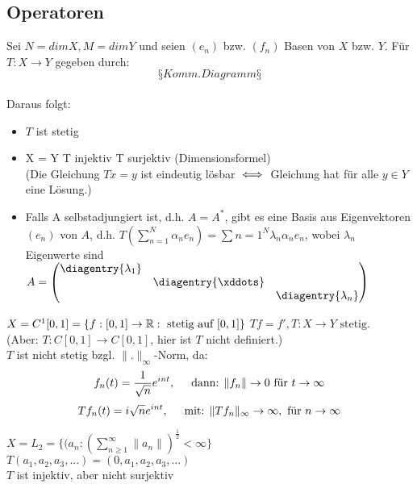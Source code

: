 \subsection{Operatoren}

Sei $N = dim X, M = dim Y$ und seien $(e_n)$ bzw. $(f_n)$ Basen von $X$ bzw. $Y$.
Für $T : X \rightarrow Y$ gegeben durch: \\
\[ §Komm. Diagramm§ \] \\
Daraus folgt:
\begin{itemize}
	\item $T$ ist stetig
	\item X = Y \gdw T injektiv \gdw T surjektiv (Dimensionsformel) \\
	(Die Gleichung $Tx = y$ ist eindeutig lösbar $\iff$ Gleichung hat für alle $y \in Y$ eine Lösung.)
	\item Falls A selbstadjungiert ist, d.h. $A = A^{*}$, gibt es eine Basis aus Eigenvektoren $(e_{n})$ von $A$, d.h. $ T( \sum_{n=1}^{N} \alpha_{n} e_{n} ) = \sum{n=1}^{N} \lambda_{n} \alpha_{n} e_{n}$, wobei $\lambda_{n}$ Eigenwerte sind $A =
			\begin{pmatrix}
				\diagentry{\lambda_{1}}\\
				&\diagentry{\xddots}\\
				&&\diagentry{\lambda_{n}}\\
			\end{pmatrix} $ %
\end{itemize}

\begin{beispiel}[1]
$X = C^{1}[0, 1] = \{ f : [0, 1] \rightarrow \mathbb{R}: \text{ stetig auf } [0, 1] \}$ 
$T f = f', T : X \rightarrow Y \text{ stetig.} $ \\
(Aber: $T: C[0, 1] \rightarrow C[0, 1]$, hier ist $T$ nicht definiert.) \\
$T$ ist nicht stetig bzgl. $\|.\|_{\infty}$-Norm, da:
\[ f_{n}(t) = \frac{1}{\sqrt{n}}e^{int}, \hspace{0.5cm}  \text{dann: } \|f_{n}\| \rightarrow 0 \text{ für } t \rightarrow \infty \]	
\[ T f_{n}(t) = i \sqrt{n} e^{int}, \hspace{0.5cm} \text{mit: } \| T f_{n} \|_{\infty} \rightarrow \infty, \text{ für } n \rightarrow \infty \]
\end{beispiel}

\begin{beispiel}[2]
$X = L_{2} = \{ (a_{n}: \left( \sum_{n \geq 1}^{\infty} \| a_{n} \| \right)^{\frac{1}{2}} < \infty \}$	\\
$T ( a_{1}, a_{2}, a_{3}, ...) = ( 0, a_{1}, a_{2}, a_{3}, ...)$ \\
$T$ ist injektiv, aber nicht surjektiv
\end{beispiel}

